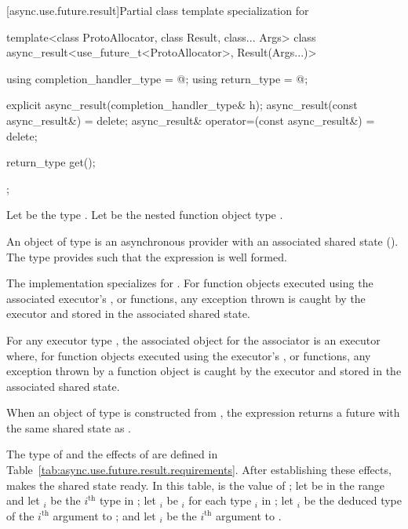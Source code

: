 [async.use.future.result]{Partial class template specialization 
        for }

%
%
\begin{codeblock}
template<class ProtoAllocator, class Result, class... Args>
class async_result<use_future_t<ProtoAllocator>, Result(Args...)>
{
  using completion_handler_type = @\seebelow@;
  using return_type =  @\seebelow@;

  explicit async_result(completion_handler_type& h);
  async_result(const async_result&) = delete;
  async_result& operator=(const async_result&) = delete;

  return_type get();
};
\end{codeblock}

\pnum
Let  be the type . Let  be the nested function object type .

\pnum
An object  of type  is an asynchronous provider with an associated shared state (). The type  provides  such that the expression  is well formed.

\pnum
The implementation specializes  for . For function objects executed using the associated executor's ,  or  functions, any exception thrown is caught by the executor and stored in the associated shared state.

\pnum
For any executor type , the associated object for the associator  is an executor where, for function objects executed using the executor's ,  or  functions, any exception thrown by a function object is caught by the executor and stored in the associated shared state.

\pnum
When an object  of type  is constructed from , the expression  returns a future with the same shared state as .

\pnum
The type of  and the effects of  are defined in Table~\ref{tab:async.use.future.result.requirements}. After establishing these effects,  makes the shared state ready. In this table,  is the value of ; let  be in the range  and let $_i$ be the $i^\text{th}$ type in ; let $_i$ be $_i$\tcode{>} for each type $_i$ in ; let $_i$ be the deduced type of the $i^\text{th}$ argument to ; and let $_i$ be the $i^\text{th}$ argument to .

